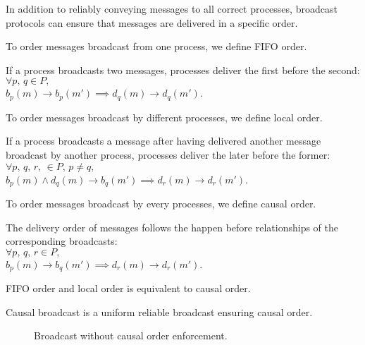 In addition to reliably conveying messages to all correct processes, broadcast
protocols can ensure that messages are delivered in a specific order.

To order messages broadcast from one process, we define FIFO order.

\begin{definition}
  If a process broadcasts two messages, processes deliver the first before the
  second:\\
  $\forall p,\,q \in P,\,$\\$b_p(m) \rightarrow b_p(m') \implies d_q(m) \rightarrow
  d_q(m')$.
\end{definition}

To order messages broadcast by different processes, we define local order.

\begin{definition}
  If a process broadcasts a message after having delivered another message
  broadcast by another process, processes deliver the later before the former:\\
  $\forall p,\,q,\,r,\, \in P,\,p\neq q,\,$\\$b_p(m) \wedge d_q(m) \rightarrow b_q(m') \implies d_r(m) \rightarrow d_r(m')$.
\end{definition}

To order messages broadcast by every processes, we define causal order.

\begin{definition}
  The delivery order of messages follows the happen before relationships of the
  corresponding broadcasts:\\ $\forall
  p,\,q,\,r \in P,\,$\\$b_p(m) \rightarrow b_q(m') \implies d_r(m) \rightarrow d_r(m')$.
\end{definition}

\begin{theorem}
  FIFO order and local order is equivalent to causal order.
\end{theorem}

\begin{definition}
  Causal broadcast is a uniform reliable broadcast ensuring causal order.
\end{definition}

\begin{figure}
  \begin{center}
  
  \caption{\label{fig:generalproblem}Broadcast without causal order
    enforcement.}
  \end{center}
\end{figure}

